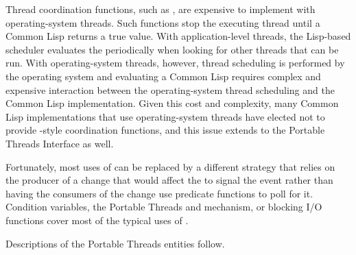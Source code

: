 \documentclass[10pt,twoside,english,pdftex]{article}
\begin{document}
Thread coordination functions, such as , are
expensive to implement with operating-system threads.  Such functions stop the
executing thread until a Common Lisp  returns a true
value.  With application-level threads, the Lisp-based scheduler evaluates the
 periodically when looking for other threads that
can be run.  With operating-system threads, however, thread scheduling is
performed by the operating system and evaluating a Common Lisp
 requires complex and expensive interaction between
the operating-system thread scheduling and the Common Lisp implementation.
Given this cost and complexity, many Common Lisp implementations that use
operating-system threads have elected not to provide
-style coordination functions, and this issue
extends to the Portable Threads Interface as well.

Fortunately, most uses of  can be replaced by a
different strategy that relies on the producer of a change that would affect
the   to signal the event
rather than having the consumers of the change use predicate functions to poll
for it.  Condition variables, the Portable Threads
 and
 mechanism, or blocking I/O functions
cover most of the typical uses of .

\W\entities
\T{}
\T Descriptions of the Portable Threads entities follow.
\T\clearpage

\end{document}
